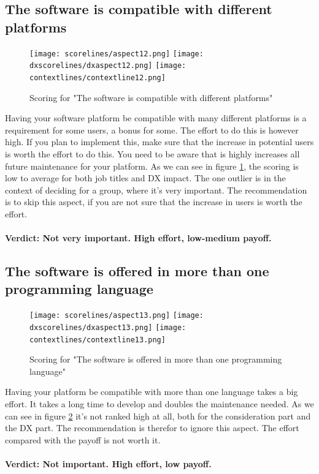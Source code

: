 \documentclass{cslthse-msc}
\begin{document}
    \subsection{The software is compatible with different platforms}
    \begin{figure}[H]
        \centering
        \texttt{[image: scorelines/aspect12.png]}
        \texttt{[image: dxscorelines/dxaspect12.png]}
        \texttt{[image: contextlines/contextline12.png]}
        \caption{Scoring for "The software is compatible with different platforms"}
        \label{fig:aspect12}
    \end{figure}
    Having your software platform be compatible with many different platforms is a requirement for some users, a bonus for some. The effort to do this is however high. If you plan to implement this, make sure that the increase in potential users is worth the effort to do this. You need to be aware that is highly increases all future maintenance for your platform. As we can see in figure \ref{fig:aspect12}, the scoring is low to average for both job titles and DX impact. The one outlier is in the context of deciding for a group, where it's very important. The recommendation is to skip this aspect, if you are not sure that the increase in users is worth the effort. \\ \\
    \textbf{Verdict: Not very important. High effort, low-medium payoff.}

    \subsection{The software is offered in more than one programming language}
    \begin{figure}[H]
        \centering
        \texttt{[image: scorelines/aspect13.png]}
        \texttt{[image: dxscorelines/dxaspect13.png]}
        \texttt{[image: contextlines/contextline13.png]}
        \caption{Scoring for "The software is offered in more than one programming language"}
        \label{fig:aspect13}
    \end{figure}
    Having your platform be compatible with more than one language takes a big effort. It takes a long time to develop and doubles the maintenance needed. As we can see in figure \ref{fig:aspect13} it's not ranked high at all, both for the consideration part and the DX part. The recommendation is therefor to ignore this aspect. The effort compared with the payoff is not worth it. \\ \\
    \textbf{Verdict: Not important. High effort, low payoff.}
\end{document}
